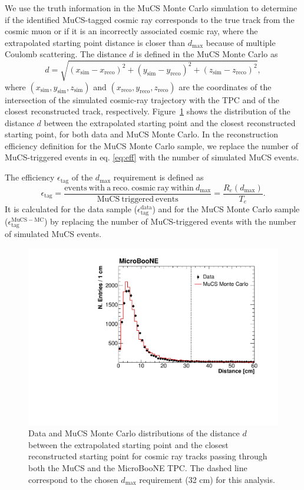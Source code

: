 \documentclass[a4paper,11pt]{article}
\begin{document}
We use the truth information in the MuCS Monte Carlo simulation to determine if the identified MuCS-tagged cosmic ray corresponds to the true track from the cosmic muon or if it is an incorrectly associated cosmic ray, where the extrapolated starting point distance is closer than $d_{\mathrm{max}}$ because of multiple Coulomb scattering.
The distance $d$ is defined in the MuCS Monte Carlo as
\begin{equation}\label{eq:d_mc}
d = \sqrt{(x_{\mathrm{sim}}-x_{\mathrm{reco}})^2+(y_{\mathrm{sim}}-y_{\mathrm{reco}})^2+(z_{\mathrm{sim}}-z_{\mathrm{reco}})^2},
\end{equation}
where $(x_{\mathrm{sim}},y_{\mathrm{sim}},z_{\mathrm{sim}})$ and $(x_{\mathrm{reco}},y_{\mathrm{reco}},z_{\mathrm{reco}})$ are the coordinates of the intersection of the simulated cosmic-ray trajectory with the TPC and of the closest reconstructed track, respectively. Figure~\ref{fig:dist} shows the distribution of the distance $d$ between the extrapolated starting point and the closest reconstructed starting point, for both data and MuCS Monte Carlo.
In the reconstruction efficiency definition for the MuCS Monte Carlo sample, we replace the number of MuCS-triggered events in eq. \eqref{eq:eff} with the number of simulated MuCS events. 

The efficiency $\epsilon_{\mathrm{tag}}$ of the $d_{\mathrm{max}}$ requirement is defined as
\begin{equation}
  \epsilon_{\mathrm{tag}}=\frac{\mathrm{events~with~a~reco.~cosmic~ray~within~}d_{\mathrm{max}}}{\mathrm{MuCS~triggered~events}} = \frac{R_{e}(d_{\mathrm{max}})}{T_{e}}.
\end{equation}
It is calculated for the data sample ($\epsilon^{\mathrm{data}}_{\mathrm{tag}}$) and for the MuCS Monte Carlo sample ($\epsilon^{\mathrm{MuCS-MC}}_{\mathrm{tag}}$) by replacing the number of MuCS-triggered events with the number of simulated MuCS events.

\begin{figure}[htbp]
  \begin{center}
    \includegraphics[width=0.7\linewidth]{figures/dist.pdf}
    \caption{Data and MuCS Monte Carlo distributions of the distance $d$ between the extrapolated starting point and the closest reconstructed starting point for cosmic ray tracks passing through both the MuCS and the MicroBooNE TPC. The dashed line correspond to the chosen $d_{\mathrm{max}}$ requirement (32 cm) for this analysis.} \label{fig:dist}
  \end{center}
\end{figure}
\end{document}
